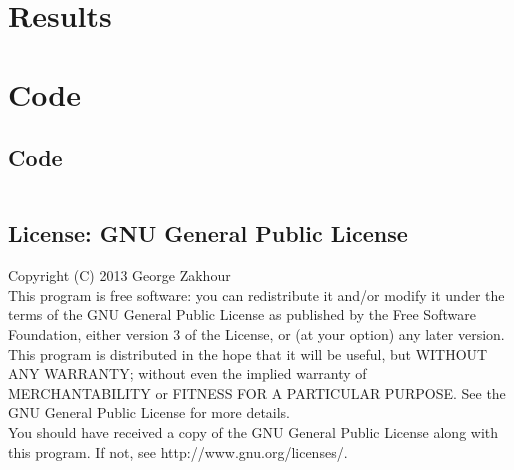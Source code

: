 \documentclass[a4paper, 10pt]{article}
\begin{document}
\newpage
\section{Results}

\newpage
\section{Code}
    \subsection{Code}
\begin{verbatim}
\end{verbatim}
    \subsection{License: GNU General Public License}
    Copyright (C) 2013 George Zakhour\\

    This program is free software: you can redistribute it and/or modify it under
    the terms of the GNU General Public License as published by the Free Software
    Foundation, either version 3 of the License, or (at your option) any later
    version.\\

    This program is distributed in the hope that it will be useful, but WITHOUT ANY
    WARRANTY; without even the implied warranty of MERCHANTABILITY or FITNESS FOR A
    PARTICULAR PURPOSE. See the GNU General Public License for more details.\\

    You should have received a copy of the GNU General Public License along with
    this program. If not, see http://www.gnu.org/licenses/.\\
\end{document}
